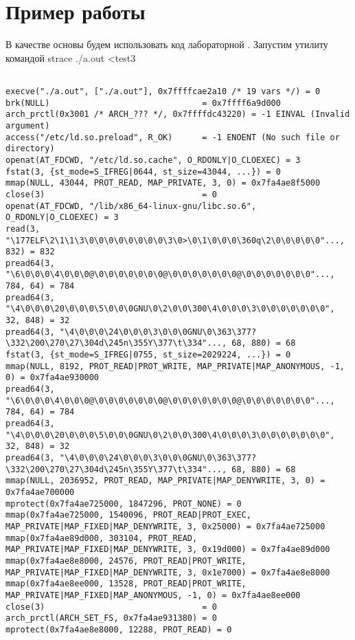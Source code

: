 \section{Пример работы}

В качестве основы будем использовать код лабораторной . Запустим утилиту командой strace ./a.out <test3

\begin{verbatim}

execve("./a.out", ["./a.out"], 0x7ffffcae2a10 /* 19 vars */) = 0
brk(NULL)                               = 0x7ffff6a9d000
arch_prctl(0x3001 /* ARCH_??? */, 0x7ffffdc43220) = -1 EINVAL (Invalid argument)
access("/etc/ld.so.preload", R_OK)      = -1 ENOENT (No such file or directory)
openat(AT_FDCWD, "/etc/ld.so.cache", O_RDONLY|O_CLOEXEC) = 3
fstat(3, {st_mode=S_IFREG|0644, st_size=43044, ...}) = 0
mmap(NULL, 43044, PROT_READ, MAP_PRIVATE, 3, 0) = 0x7fa4ae8f5000
close(3)                                = 0
openat(AT_FDCWD, "/lib/x86_64-linux-gnu/libc.so.6", O_RDONLY|O_CLOEXEC) = 3
read(3, "\177ELF\2\1\1\3\0\0\0\0\0\0\0\0\3\0>\0\1\0\0\0\360q\2\0\0\0\0\0"..., 832) = 832
pread64(3, "\6\0\0\0\4\0\0\0@\0\0\0\0\0\0\0@\0\0\0\0\0\0\0@\0\0\0\0\0\0\0"..., 784, 64) = 784
pread64(3, "\4\0\0\0\20\0\0\0\5\0\0\0GNU\0\2\0\0\300\4\0\0\0\3\0\0\0\0\0\0\0", 32, 848) = 32
pread64(3, "\4\0\0\0\24\0\0\0\3\0\0\0GNU\0\363\377?\332\200\270\27\304d\245n\355Y\377\t\334"..., 68, 880) = 68
fstat(3, {st_mode=S_IFREG|0755, st_size=2029224, ...}) = 0
mmap(NULL, 8192, PROT_READ|PROT_WRITE, MAP_PRIVATE|MAP_ANONYMOUS, -1, 0) = 0x7fa4ae930000
pread64(3, "\6\0\0\0\4\0\0\0@\0\0\0\0\0\0\0@\0\0\0\0\0\0\0@\0\0\0\0\0\0\0"..., 784, 64) = 784
pread64(3, "\4\0\0\0\20\0\0\0\5\0\0\0GNU\0\2\0\0\300\4\0\0\0\3\0\0\0\0\0\0\0", 32, 848) = 32
pread64(3, "\4\0\0\0\24\0\0\0\3\0\0\0GNU\0\363\377?\332\200\270\27\304d\245n\355Y\377\t\334"..., 68, 880) = 68
mmap(NULL, 2036952, PROT_READ, MAP_PRIVATE|MAP_DENYWRITE, 3, 0) = 0x7fa4ae700000
mprotect(0x7fa4ae725000, 1847296, PROT_NONE) = 0
mmap(0x7fa4ae725000, 1540096, PROT_READ|PROT_EXEC, MAP_PRIVATE|MAP_FIXED|MAP_DENYWRITE, 3, 0x25000) = 0x7fa4ae725000
mmap(0x7fa4ae89d000, 303104, PROT_READ, MAP_PRIVATE|MAP_FIXED|MAP_DENYWRITE, 3, 0x19d000) = 0x7fa4ae89d000
mmap(0x7fa4ae8e8000, 24576, PROT_READ|PROT_WRITE, MAP_PRIVATE|MAP_FIXED|MAP_DENYWRITE, 3, 0x1e7000) = 0x7fa4ae8e8000
mmap(0x7fa4ae8ee000, 13528, PROT_READ|PROT_WRITE, MAP_PRIVATE|MAP_FIXED|MAP_ANONYMOUS, -1, 0) = 0x7fa4ae8ee000
close(3)                                = 0
arch_prctl(ARCH_SET_FS, 0x7fa4ae931380) = 0
mprotect(0x7fa4ae8e8000, 12288, PROT_READ) = 0

\end{verbatim}
